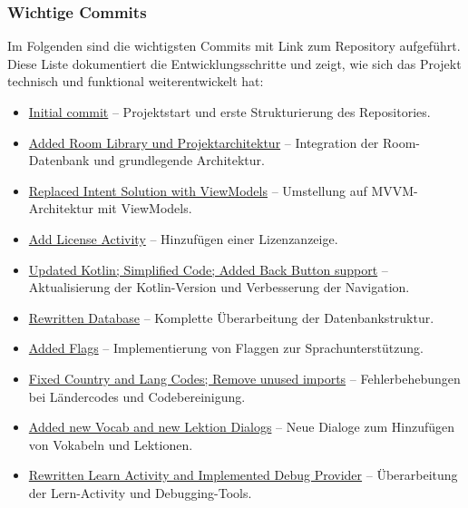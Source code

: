 \documentclass[12pt,a4paper]{article}
\begin{document}
\subsubsection{Wichtige Commits}
Im Folgenden sind die wichtigsten Commits mit Link zum Repository aufgeführt. Diese Liste dokumentiert die Entwicklungsschritte und zeigt, wie sich das Projekt technisch und funktional weiterentwickelt hat:
\begin{itemize}
    \item \href{https://github.com/Erik-Donath/Palabra/commit/864ebf0f71aac98fae10cba9fc118028a1333fd8}{Initial commit} -- Projektstart und erste Strukturierung des Repositories.
    \item \href{https://github.com/Erik-Donath/Palabra/commit/13b34d5efca6c7f2dcc97147ada92919e193a322}{Added Room Library und Projektarchitektur} -- Integration der Room-Datenbank und grundlegende Architektur.
    \item \href{https://github.com/Erik-Donath/Palabra/commit/0d82f5896756da601495fac90b8f8a05eca06a81}{Replaced Intent Solution with ViewModels} -- Umstellung auf MVVM-Architektur mit ViewModels.
    \item \href{https://github.com/Erik-Donath/Palabra/commit/11be0359de673b3c92dd18909bb47f754bcf3040}{Add License Activity} -- Hinzufügen einer Lizenzanzeige.
    \item \href{https://github.com/Erik-Donath/Palabra/commit/507cadc495cdee66976928d968aa23b10c6f086d}{Updated Kotlin; Simplified Code; Added Back Button support} -- Aktualisierung der Kotlin-Version und Verbesserung der Navigation.
    \item \href{https://github.com/Erik-Donath/Palabra/commit/c65171940fad9fe11f5604990ea31395d8c1b829}{Rewritten Database} -- Komplette Überarbeitung der Datenbankstruktur.
    \item \href{https://github.com/Erik-Donath/Palabra/commit/56ce6556d47316994946e8291166b68bd2bec3f9}{Added Flags} -- Implementierung von Flaggen zur Sprachunterstützung.
    \item \href{https://github.com/Erik-Donath/Palabra/commit/bc822c0f34fbeec6566a5ba35a1defa666dad456}{Fixed Country and Lang Codes; Remove unused imports} -- Fehlerbehebungen bei Ländercodes und Codebereinigung.
    \item \href{https://github.com/Erik-Donath/Palabra/commit/a31289a9ef71628d3ffa6170a53dae528de9d0e5}{Added new Vocab and new Lektion Dialogs} -- Neue Dialoge zum Hinzufügen von Vokabeln und Lektionen.
    \item \href{https://github.com/Erik-Donath/Palabra/commit/a846ee02333d85817c9655c5fd34cc9a7acabd9d}{Rewritten Learn Activity and Implemented Debug Provider} -- Überarbeitung der Lern-Activity und Debugging-Tools.

\end{itemize}
\end{document}
